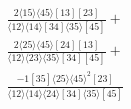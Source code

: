 \documentclass[varwidth, border=5pt]{standalone}
\begin{document}
\begin{my}
$\begin{gathered}
\scriptscriptstyle\frac{2⟨15⟩⟨45⟩[13][23]}{⟨12⟩⟨14⟩[34]⟨35⟩[45]}+\\
\scriptscriptstyle\frac{2⟨25⟩⟨45⟩[24][13]}{⟨12⟩⟨23⟩⟨35⟩[34][45]}+\\
\scriptscriptstyle\frac{-1[35]⟨25⟩⟨45⟩^2[23]}{⟨12⟩⟨14⟩⟨24⟩[34]⟨35⟩[45]}\phantom{+}
\end{gathered}$
\end{my}
\end{document}
